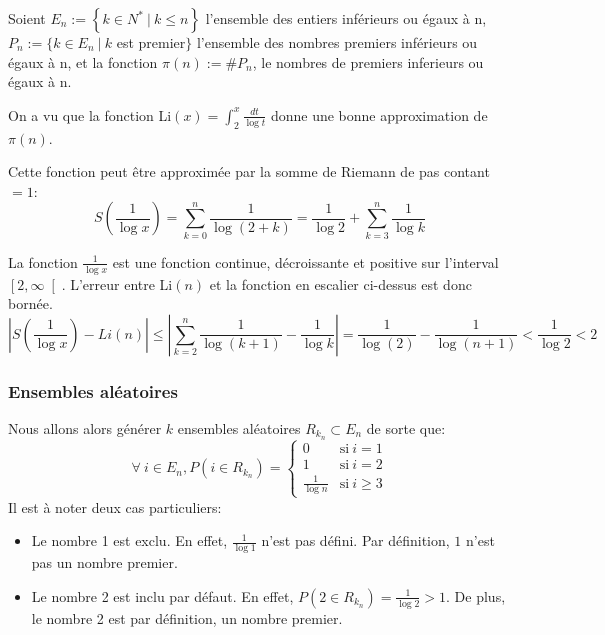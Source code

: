 \documentclass[../main.tex]{report}
\begin{document}
    \label{sec:test1}
    
Soient $E_n := \left\{ k \in N^* ~|~k \leq n \right\}$ l'ensemble des entiers inférieurs ou égaux à n, $ P_n := \{k \in E_n~|~ k$ est premier$ \}$ l'ensemble des nombres premiers inférieurs ou égaux à n, et la fonction $\pi (n) := \#P_n$, le nombres de premiers inferieurs ou égaux à n.

On a vu que la fonction Li$(x) = \int_2^x \frac{dt}{\log t}$ 
donne une bonne approximation de $\pi(n)$.

Cette fonction peut être approximée par la somme de Riemann de pas contant $=1$:
\begin{equation}
\label{eq:SommeDeRiemann}
S(\frac{1}{\log x})
= \sum_{k=0}^n \frac{1}{\log(2 + k)}
= \frac{1}{\log 2} + \sum_{k=3}^n \frac{1}{\log k}
\end{equation}


La fonction $\frac{1}{\log x}$ est une fonction continue, décroissante et positive sur l'interval $\left[2, \infty \right[$. 
L'erreur entre Li$(n)$ et la fonction en escalier ci-dessus est donc bornée. 
 \[ 
\left| S(\frac{1}{\log x}) - Li(n) \right|
\leq \left| \sum_{k=2}^n \frac{1}{\log (k+1)} - \frac{1}{\log k} \right| 
 = \frac{1}{\log (2)} - \frac{1}{\log (n+1)}
 < \frac{1}{\log 2}
 < 2
 \]


\subsubsection{Ensembles aléatoires} 

Nous allons alors générer $k$ ensembles aléatoires $R_{k_n} \subset E_n$ de sorte que:
\[
\forall~i \in E_n, P(i \in R_{k_n}) = 
\left\{ 
    \begin{array}{cl}
         0 & \mbox{si}~i = 1 \\
         1 & \mbox{si}~i = 2 \\
         \frac{1}{\log n} & \mbox{si}~i \geq 3
    \end{array}
\right.
\]
Il est à noter deux cas particuliers:
\begin{itemize} 
    \item Le nombre 1 est exclu. En effet, $\frac{1}{\log 1}$ n'est pas défini. Par définition, $1$ n'est pas un nombre premier.
    \item Le nombre 2 est inclu par défaut. En effet, $P(2 \in R_{k_n}) = \frac{1}{\log 2} > 1$. De plus, le nombre 2 est par définition, un nombre premier.
\end{itemize}
\end{document}
